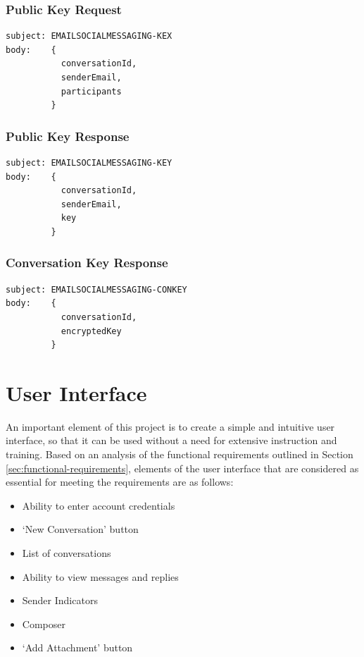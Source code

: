 \subsubsection{Public Key Request}
\begin{verbatim}
subject: EMAILSOCIALMESSAGING-KEX
body:    {
           conversationId,
           senderEmail,
           participants
         }
\end{verbatim}

\subsubsection{Public Key Response}
\begin{verbatim}
subject: EMAILSOCIALMESSAGING-KEY
body:    {
           conversationId,
           senderEmail,
           key
         }
\end{verbatim}

\subsubsection{Conversation Key Response}
\begin{verbatim}
subject: EMAILSOCIALMESSAGING-CONKEY
body:    {
           conversationId,
           encryptedKey
         }
\end{verbatim}

\section{User Interface}\label{sec:ui-design}

An important element of this project is to create a simple and intuitive user interface, so that it can be used without a need for extensive instruction and training. Based on an analysis of the functional requirements outlined in Section \ref{sec:functional-requirements}, elements of the user interface that are considered as essential for meeting the requirements are as follows:
\begin{itemize}
  \item Ability to enter account credentials
  \item `New Conversation' button
  \item List of conversations
  \item Ability to view messages and replies
  \item Sender Indicators
  \item Composer
  \item `Add Attachment' button
\end{itemize}

